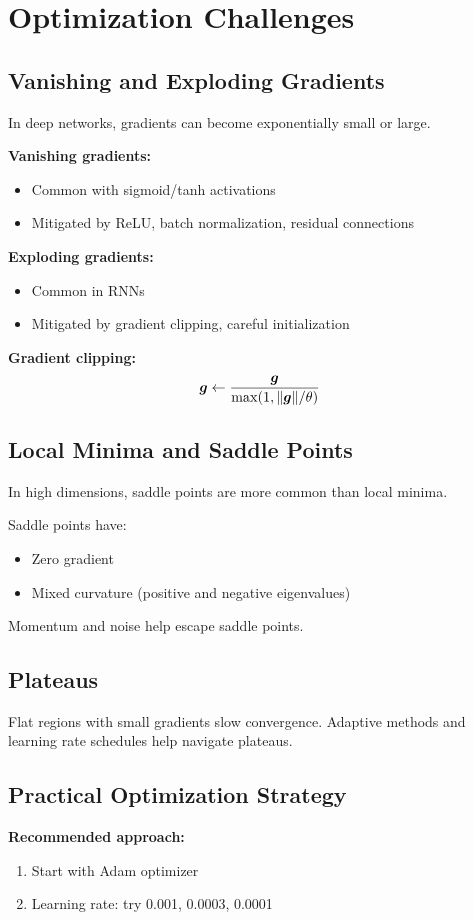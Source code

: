 
\section{Optimization Challenges}
\label{sec:challenges}

\subsection{Vanishing and Exploding Gradients}

In deep networks, gradients can become exponentially small or large.

\textbf{Vanishing gradients:}
\begin{itemize}
    \item Common with sigmoid/tanh activations
    \item Mitigated by ReLU, batch normalization, residual connections
\end{itemize}

\textbf{Exploding gradients:}
\begin{itemize}
    \item Common in RNNs
    \item Mitigated by gradient clipping, careful initialization
\end{itemize}

\textbf{Gradient clipping:}
\begin{equation}
\boldsymbol{g} \leftarrow \frac{\boldsymbol{g}}{\max(1, \|\boldsymbol{g}\| / \theta)}
\end{equation}

\subsection{Local Minima and Saddle Points}

In high dimensions, saddle points are more common than local minima.

Saddle points have:
\begin{itemize}
    \item Zero gradient
    \item Mixed curvature (positive and negative eigenvalues)
\end{itemize}

Momentum and noise help escape saddle points.

\subsection{Plateaus}

Flat regions with small gradients slow convergence. Adaptive methods and learning rate schedules help navigate plateaus.

\subsection{Practical Optimization Strategy}

\textbf{Recommended approach:}
\begin{enumerate}
    \item Start with Adam optimizer
    \item Learning rate: try 0.001, 0.0003, 0.0001
\end{enumerate}
